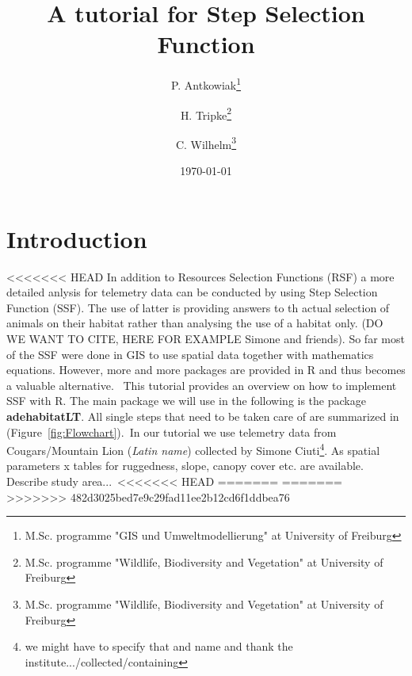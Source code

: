 \documentclass[11pt, a4paper]{article} %
\begin{document}



\title{A tutorial for Step Selection Function}

\author{P. Antkowiak\thanks{M.Sc. programme "GIS und Umweltmodellierung" at University of Freiburg} \and H. Tripke\thanks{M.Sc. programme "Wildlife, Biodiversity and Vegetation" at University of Freiburg} \and C. Wilhelm\thanks{M.Sc. programme "Wildlife, Biodiversity and Vegetation" at University of Freiburg}}

\date{\today} %

\maketitle


\tableofcontents

\newpage

\section{Introduction}%
<<<<<<< HEAD
In addition to Resources Selection Functions (RSF) a more detailed anlysis for telemetry data can be conducted by using Step Selection Function (SSF). The use of latter is providing answers to th actual selection of animals on their habitat rather than analysing the use of a habitat only. (DO WE WANT TO CITE, HERE FOR EXAMPLE Simone and friends). So far most of the SSF were done in GIS to use spatial data together with mathematics equations. However, more and more packages are provided in R and thus becomes a valuable alternative. \
This tutorial provides an overview on how to implement SSF with R. The main package we will use in the following is the package \textbf{adehabitatLT}. All single steps that need to be taken care of are summarized in (Figure~\ref{fig:Flowchart}).\
In our tutorial we use telemetry data from Cougars/Mountain Lion (\textit{Latin name}) collected by Simone Ciuti\footnote{we might have to specify that and name and thank the institute.../collected/containing}. As spatial parameters x tables for ruggedness, slope, canopy cover etc. are available. Describe study area...\
<<<<<<< HEAD
=======
=======
>>>>>>> 482d3025bed7e9c29fad11ee2b12cd6f1ddbea76
\end{document}
